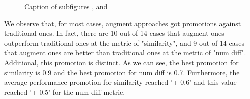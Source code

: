 \documentclass{sig-alternate}
\begin{document}
\begin{figure}[ht]
\centering
{}
\caption[Optional caption for list of figures]{Caption of subfigures ,  and }
\label{fig:subfigureExample2}
\end{figure}


We observe that, for most cases, augment approaches got promotions against traditional ones. In fact, there are 10 out of 14 cases that augment ones outperform traditional ones at the metric of "similarity", and 9 out of 14 cases that augment ones are better than traditional ones at the metric of "num diff". Additional, this promotion is distinct. As we can see, the best promotion for similarity is 0.9 and the best promotion for num diff is 0.7. Furthermore, the average performance promotion for similarity reached '+ 0.6' and this value reached '+ 0.5' for the num diff metric.
\end{document}
